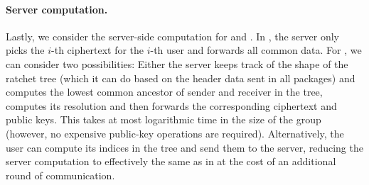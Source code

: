 \paragraph{Server computation.}
Lastly, we consider the server-side computation for \saik and \protCMPKE. In \protCMPKE, the server only picks the
$i$-th \mPKE ciphertext for the $i$-th user and forwards all common data. For \saik, we can consider two possibilities:
Either the server keeps track of the shape of the ratchet tree (which it can do based on the header data sent in all
packages) and computes the lowest common ancestor of sender and receiver in the tree, computes its resolution and then
forwards the corresponding ciphertext and public keys. This takes at most logarithmic time in the size of the
group (however, no expensive public-key operations are required). Alternatively, the user can compute its indices in the
tree and send them to the server, reducing the server computation to effectively the same as in \protCMPKE at the cost
of an additional round of communication.



